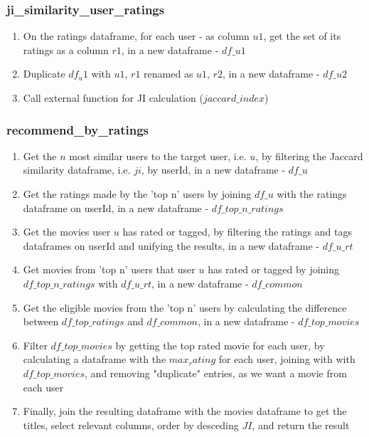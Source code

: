 \documentclass[10pt,twocolumn]{article}
\begin{document}
\subsubsection{ji\_similarity\_user\_ratings}
\begin{enumerate}
    \itemsep0em
    \item On the ratings dataframe, for each user - as column $u1$, get the set of its ratings as a column $r1$, in a new dataframe - $df\_u1$
    \item Duplicate $df_u1$ with $u1$, $r1$ renamed as $u1$, $r2$, in a new dataframe - $df\_u2$
    \item Call external function for JI calculation ($jaccard\_index$)
\end{enumerate}

\subsubsection{recommend\_by\_ratings}
\begin{enumerate}
    \itemsep0em
    \item Get the $n$ most similar users to the target user, i.e. $u$, by filtering the Jaccard similarity dataframe, i.e. $ji$, by userId, in a new dataframe - $df\_u$
    \item Get the ratings made by the 'top n' users by joining $df\_u$ with the ratings dataframe on userId, in a new dataframe - $df\_top\_n\_ratings$
    \item Get the movies user $u$ has rated or tagged, by filtering the ratings and tags dataframes on userId and unifying the results, in a new dataframe - $df\_u\_rt$
    \item Get movies from 'top n' users that user $u$ has rated or tagged by joining $df\_top\_n\_ratings$ with $df\_u\_rt$, in a new dataframe - $df\_common$
    \item Get the eligible movies from the 'top n' users by calculating the difference between $df\_top\_ratings$ and $df\_common$, in a new dataframe - $df\_top\_movies$
    \item Filter $df\_top\_movies$ by getting the top rated movie for each user, by calculating a dataframe with the $max_rating$ for each user, joining with with $df\_top\_movies$, and removing "duplicate" entries, as we want a movie from each user
    \item Finally, join the resulting dataframe with the movies dataframe to get the titles, select relevant columns, order by desceding $JI$, and return the result
\end{enumerate}
\end{document}
